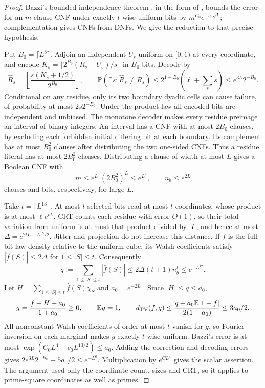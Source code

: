 \documentclass[11pt]{article}
\theoremstyle{definition}
\newcommand{\E}{\mathbb E}
\newcommand{\Prob}{\mathbb P}
\theoremstyle{remark}
\numberwithin{equation}{section}
\begin{document}
\begin{proof}
Bazzi's bounded-independence theorem \cite{Bazzi}, in the form of \cite[Theorem~1, p.~2]{Razborov}, bounds the
error for an $m$-clause CNF under exactly $t$-wise uniform bits by
$m^{C_0}e^{-c_0\sqrt t}$; complementation gives CNFs from DNFs.
We give the reduction to that precise hypothesis.

Put $B_0=\lceil L^8\rceil$. Adjoin an independent $U_s$ uniform on $[0,1)$ at every coordinate, and encode
$K_s=\lfloor2^{B_0}(R_s+U_s)/s\rfloor$ in $B_0$ bits. Decode by
\begin{equation}\label{eq:decoder}
 \widehat R_s=\left\lfloor\frac{s(K_s+1/2)}{2^{B_0}}\right\rfloor,\qquad
 \Prob(\exists s:\widehat R_s\ne R_s)
 \le2^{1-B_0}\left(\ell+\sum_s s\right)\le e^{3L}2^{-B_0}.
\end{equation}
Conditional on any residue, only its two boundary dyadic cells can cause failure, of probability at most
$2s2^{-B_0}$. Under the product law all encoded bits are independent and unbiased.
The monotone decoder makes every residue preimage an interval of binary integers.
An interval has a CNF with at most $2B_0$ clauses, by excluding each forbidden initial differing bit at each
boundary. Its complement has at most $B_0^2$ clauses after distributing the two one-sided CNFs.
Thus a residue literal has at most $2B_0^2$ clauses. Distributing a clause of width at most $L$ gives a Boolean CNF
with
\begin{equation}\label{eq:cnf-size}
 m\le e^{L^3}(2B_0^2)^L\le e^{L^4},\qquad n_b\le e^{2L}
\end{equation}
clauses and bits, respectively, for large $L$.

Take $t=\lceil L^{13}\rceil$. At most $t$ selected bits read at most $t$ coordinates, whose product is at most
$\ell e^{tL}$. CRT counts each residue with error $O(1)$, so their total variation from uniform is at most that
product divided by $|I|$, and hence at most $\Delta=e^{2tL-L^{18}/2}$.
Jitter and projection do not increase this distance. If $f$ is the full bit-law density relative to the uniform
cube, its Walsh coefficients satisfy $|\widehat f(S)|\le2\Delta$ for $1\le|S|\le t$. Consequently
\begin{equation}\label{eq:walsh-mass}
 q:=\sum_{1\le|S|\le t}|\widehat f(S)|\le2\Delta(t+1)n_b^t\le e^{-L^{17}}.
\end{equation}
Let $H=\sum_{1\le|S|\le t}\widehat f(S)\chi_S$ and $a_0=e^{-2L^6}$. Since $|H|\le q\le a_0$,
\begin{equation}\label{eq:walsh-correction}
 g=\frac{f-H+a_0}{1+a_0}\ge0,\qquad \E g=1,\qquad
 d_{\rm TV}(f,g)\le\frac{q+a_0\E|1-f|}{2(1+a_0)}\le3a_0/2.
\end{equation}
All nonconstant Walsh coefficients of order at most $t$ vanish for $g$, so Fourier inversion on each marginal
makes $g$ exactly $t$-wise uniform.
Bazzi's error is at most $\exp(C_0L^4-c_0L^{13/2})\le a_0$.
Adding the correction and decoding errors gives
$2e^{3L}2^{-B_0}+5a_0/2\le e^{-L^6}$.
Multiplication by $e^{CL^4}$ gives the scalar assertion. The argument used only the coordinate count, sizes and
CRT, so it applies to prime-square coordinates as well as primes.
\end{proof}
\end{document}
